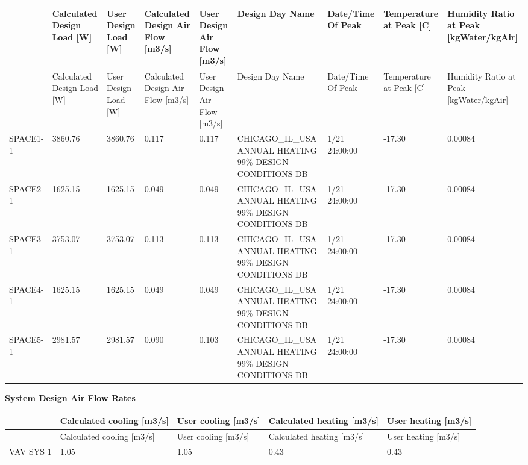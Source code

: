 {\scriptsize
\begin{longtable}[c]{>{\raggedright}p{0.66in}>{\raggedright}p{0.66in}>{\raggedright}p{0.66in}>{\raggedright}p{0.66in}>{\raggedright}p{0.66in}>{\raggedright}p{0.66in}>{\raggedright}p{0.66in}>{\raggedright}p{0.66in}>{\raggedright}p{0.66in}}
\toprule 
 & Calculated Design Load [W] & User Design Load [W] & Calculated Design Air Flow [m3/s] & User Design Air Flow [m3/s] & Design Day Name & Date/Time Of Peak & Temperature at Peak [C] & Humidity Ratio at Peak [kgWater/kgAir] \tabularnewline
\midrule
\endfirsthead

\toprule 
 & Calculated Design Load [W] & User Design Load [W] & Calculated Design Air Flow [m3/s] & User Design Air Flow [m3/s] & Design Day Name & Date/Time Of Peak & Temperature at Peak [C] & Humidity Ratio at Peak [kgWater/kgAir] \tabularnewline
\midrule
\endhead

SPACE1-1 & 3860.76 & 3860.76 & 0.117 & 0.117 & CHICAGO\-\_IL\-\_USA ANNUAL HEATING 99\% DESIGN CONDITIONS DB & 1/21 24:00:00 & -17.30 & 0.00084 \tabularnewline
SPACE2-1 & 1625.15 & 1625.15 & 0.049 & 0.049 & CHICAGO\-\_IL\-\_USA ANNUAL HEATING 99\% DESIGN CONDITIONS DB & 1/21 24:00:00 & -17.30 & 0.00084 \tabularnewline
SPACE3-1 & 3753.07 & 3753.07 & 0.113 & 0.113 & CHICAGO\-\_IL\-\_USA ANNUAL HEATING 99\% DESIGN CONDITIONS DB & 1/21 24:00:00 & -17.30 & 0.00084 \tabularnewline
SPACE4-1 & 1625.15 & 1625.15 & 0.049 & 0.049 & CHICAGO\-\_IL\-\_USA ANNUAL HEATING 99\% DESIGN CONDITIONS DB & 1/21 24:00:00 & -17.30 & 0.00084 \tabularnewline
SPACE5-1 & 2981.57 & 2981.57 & 0.090 & 0.103 & CHICAGO\-\_IL\-\_USA ANNUAL HEATING 99\% DESIGN CONDITIONS DB & 1/21 24:00:00 & -17.30 & 0.00084 \tabularnewline
\bottomrule
\end{longtable}}

\textbf{System Design Air Flow Rates}

\begin{longtable}[c]{>{\raggedright}p{1.2in}>{\raggedright}p{1.2in}>{\raggedright}p{1.2in}>{\raggedright}p{1.2in}>{\raggedright}p{1.2in}}
\toprule 
 & Calculated cooling [m3/s] & User cooling [m3/s] & Calculated heating [m3/s] & User heating [m3/s] \tabularnewline
\midrule
\endfirsthead

\toprule 
 & Calculated cooling [m3/s] & User cooling [m3/s] & Calculated heating [m3/s] & User heating [m3/s] \tabularnewline
\midrule
\endhead

VAV SYS 1 & 1.05 & 1.05 & 0.43 & 0.43 \tabularnewline
\bottomrule
\end{longtable}

